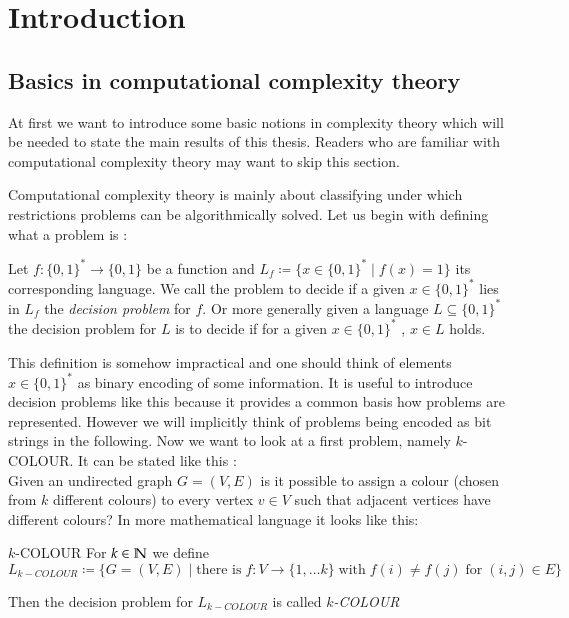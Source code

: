 \section{Introduction}

\subsection{Basics in computational complexity theory}
At first we want to introduce some basic notions in complexity theory which will be needed to state the main results of this thesis.
Readers who are familiar with computational complexity theory may want to skip this section.

Computational complexity theory is mainly about classifying under which restrictions problems can be algorithmically solved.
Let us begin with defining what a problem is :

\begin{Definition}
 Let $f \colon {\lbrace 0,1 \rbrace}^* \to {\lbrace 0,1 \rbrace}$ be a function and $L_f \coloneqq {\lbrace 
 x \in {\lbrace 0,1 \rbrace}^*  \; | \; f(x) = 1 \rbrace} $ its corresponding language. We call the 
 problem to decide if a given $x \in {\lbrace 0,1 \rbrace}^*$ lies in $L_f$ the \emph{decision problem} for $f$.
 Or more generally given a language $L \subseteq {\lbrace 0,1 \rbrace}^*$ the decision problem for $L$ is to decide
 if for a given $x \in {\lbrace 0,1 \rbrace}^* $ , $x \in L$ holds.
\end{Definition}

This definition is somehow impractical and one should think of elements $x \in {\lbrace 0,1 \rbrace}^*$ as binary encoding
of some information. It is useful to introduce decision problems like this because it provides a common basis how problems
are represented. However we will implicitly think of problems being encoded as bit strings in the following. Now
we want to look at a first problem, namely $k$-COLOUR. It can be stated like this : \\
 Given an undirected graph $ G = (V,E)$ is it possible to assign a colour (chosen from $k$ different colours) to every vertex 
 $v \in V$ such that adjacent vertices have different colours? In more mathematical language it looks like this:

\begin{Problem}{$k$-COLOUR}
 For $k \in \mathbb{N}$ we define $$L_{k-COLOUR} \coloneqq \lbrace G  = (V,E) \; | \; \text{there is} \; f \colon V \to \lbrace 1, \dotsc k \rbrace
 \; \text{with} \; f(i) \neq f(j) \; \text{for} \; (i,j) \in E \rbrace $$
 
 Then the decision problem for $L_{k-COLOUR}$ is called \emph{$k$-COLOUR}
\end{Problem}

